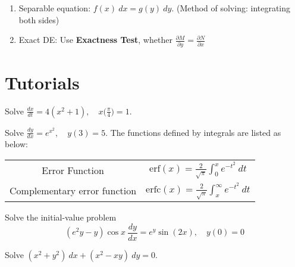 \begin{enumerate}
    \item Separable equation: $f(x) \>dx = g(y) \>dy$. (Method of solving: integrating both sides)
    \item Exact DE: Use \textbf{Exactness Test}, whether 
        $\displaystyle \frac{\partial M}{\partial y} = \frac{\partial N}{\partial x}$
\end{enumerate}

\section{Tutorials}

\begin{mdframed}
    \vspace{-0.25cm}
    \hspace{-0.25cm}
    \begin{Exercise}
        Solve $\displaystyle \frac{dx}{dt} = 4(x^2 + 1), \quad x\biggl(\displaystyle \frac{\pi}{4}\biggr) = 1$.
    \end{Exercise}

    \begin{Exercise}
        Solve $\displaystyle \frac{dy}{dx} = e^{x^2}, \quad y(3) = 5$. The functions defined by integrals are 
        listed as below:

        \begin{center}
            \begin{tabular}{c|c|}
                Error Function & $\displaystyle \text{erf}(x) = \frac{2}{\sqrt{\pi}} \int_{0}^{x} e^{-t^2}\> dt$\\[1em]
                Complementary error function & $\displaystyle \text{erfc}(x) = \frac{2}{\sqrt{\pi}} \int_{x}^{\infty} e^{-t^2}\> dt$\\[1em]
                \hline
            \end{tabular}
        \end{center}
    \end{Exercise}

    \begin{Exercise}
        Solve the initial-value problem
        \[
            (e^{2}y - y) \cos x \> \frac{dy}{dx} = e^y \sin(2x), \quad y(0) = 0
        \]
    \end{Exercise}

    \begin{Exercise}
        Solve $(x^2 + y^2) \> dx + (x^2 - xy) \> dy = 0$.
    \end{Exercise}
\end{mdframed}